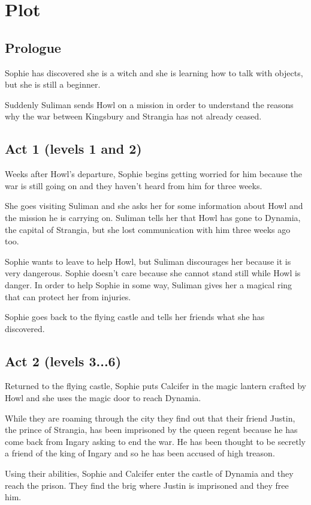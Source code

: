 \section{Plot}

\subsection*{Prologue}
Sophie has discovered she is a witch and she is learning how to talk with objects, but she is still a beginner.

Suddenly Suliman sends Howl on a mission in order to understand the reasons why the war between Kingsbury and Strangia has not already ceased.

\subsection*{Act 1 (levels 1 and 2)}
Weeks after Howl's departure, Sophie begins getting worried for him because the war is still going on and they haven't heard from him for three weeks.

She goes visiting Suliman and she asks her for some information about Howl and the mission he is carrying on. Suliman tells her that Howl has gone to Dynamia, the capital of Strangia, but she lost communication with him three weeks ago too.

Sophie wants to leave to help Howl, but Suliman discourages her because it is very dangerous. Sophie doesn't care because she cannot stand still while Howl is danger. In order to help Sophie in some way, Suliman gives her a magical ring that can protect her from injuries.

Sophie goes back to the flying castle and tells her friends what she has discovered.

\subsection*{Act 2 (levels 3...6)}
Returned to the flying castle, Sophie puts Calcifer in the magic lantern crafted by Howl and she uses the magic door to reach Dynamia.

While they are roaming through the city they find out that their friend Justin, the prince of Strangia, has been imprisoned by the queen regent because he has come back from Ingary asking to end the war. He has been thought to be secretly a friend of the king of Ingary and so he has been accused of high treason. 

Using their abilities, Sophie and Calcifer enter the castle of Dynamia and they reach the prison. They find the brig where Justin is imprisoned and they free him.

